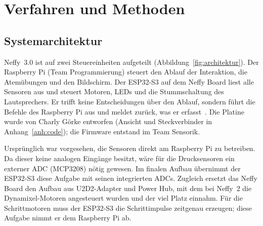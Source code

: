 \chapter{Verfahren und Methoden}
\label{kap:methoden}

\section{Systemarchitektur}
\label{sec:architektur}

Neffy~3.0 ist auf zwei Steuereinheiten aufgeteilt (Abbildung~\ref{fig:architektur}).
Der Raspberry Pi (Team Programmierung) steuert den Ablauf der Interaktion, die Atemübungen
und den Bildschirm. Der ESP32-S3 auf dem Neffy Board liest alle Sensoren aus und steuert
Motoren, \acp{LED} und die Stummschaltung des Lautsprechers. Er trifft keine Entscheidungen
über den Ablauf, sondern führt die Befehle des Raspberry Pi aus und meldet zurück, was er
erfasst~\cite{jamil2026mainboard}. Die Platine wurde von Charly Görke entworfen (Ansicht und Steckverbinder in Anhang~\ref{anh:code}); die Firmware
entstand im Team Sensorik.

Ursprünglich war vorgesehen, die Sensoren direkt am Raspberry Pi zu betreiben. Da dieser
keine analogen Eingänge besitzt, wäre für die Drucksensoren ein externer \ac{ADC}
(MCP3208) nötig gewesen. Im finalen Aufbau übernimmt der ESP32-S3 diese Aufgabe mit seinen
integrierten \acp{ADC}.
Zugleich ersetzt das Neffy Board den Aufbau aus U2D2-Adapter und Power Hub, mit dem bei
Neffy~2 die Dynamixel-Motoren angesteuert wurden und der viel Platz einnahm. Für die
Schrittmotoren muss der ESP32-S3 die Schrittimpulse zeitgenau erzeugen; diese Aufgabe nimmt
er dem Raspberry Pi ab.

